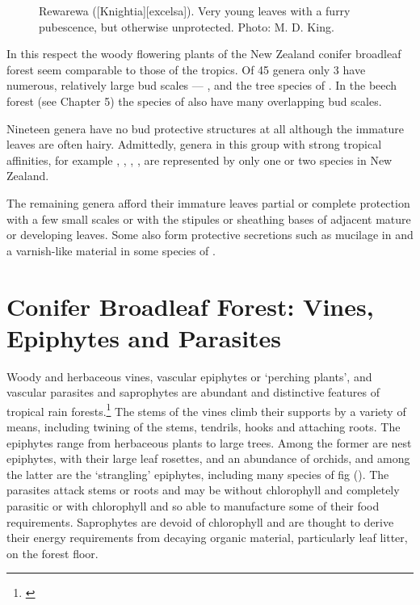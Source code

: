\begin{figure}[htb]
\begin{minipage}[t]{0.316\textwidth}
    	\caption[Rewarewa leaves]{Rewarewa ([Knightia][excelsa]).
    	Very young leaves with a furry pubescence, but otherwise unprotected.
    	Photo: M. D. King.}%
    	\label{fig:25rewarewa}
	\end{minipage}
\end{figure}

In this respect the woody flowering plants of the New Zealand conifer broadleaf forest seem comparable to those of the tropics.
Of 45 genera only 3 have numerous, relatively large bud scales --- ,  and the tree species of .
In the beech forest (see Chapter 5) the species of  also have many overlapping bud scales.

Nineteen genera have no bud protective structures at all although the immature leaves are often hairy.
Admittedly, genera in this group with strong tropical affinities, for example , , , , are represented by only one or two species in New Zealand.

The remaining genera afford their immature leaves partial or complete protection with a few small scales or with the stipules or sheathing bases of adjacent mature or developing leaves.
Some also form protective secretions such as mucilage in  and a varnish-like material in some species of .

\chapter{Conifer Broadleaf Forest: Vines, Epiphytes and Parasites}

Woody and herbaceous vines, vascular epiphytes or `perching plants', and vascular parasites and saprophytes are abundant and distinctive features of tropical rain forests.\footnote{\cite{richards1952tropical}}
The stems of the vines climb their supports by a variety of means, including twining of the stems, tendrils, hooks and attaching roots.
The epiphytes range from herbaceous plants to large trees.
Among the former are nest epiphytes, with their large leaf rosettes, and an abundance of orchids, and among the latter are the `strangling' epiphytes, including many species of fig ().
The parasites attack stems or roots and may be without chlorophyll and completely parasitic or with chlorophyll and so able to manufacture some of their food requirements.
Saprophytes are devoid of chlorophyll and are thought to derive their energy requirements from decaying organic material, particularly leaf litter, on the forest floor.

